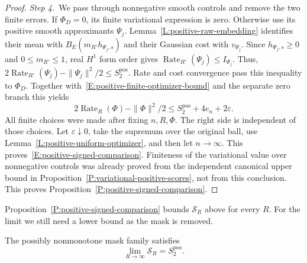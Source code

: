 \begin{proof}
  \medskip
  \noindent\textit{Step 4.~}We pass through nonnegative smooth controls and
  remove the two finite errors.
  If $\Phi_D = 0$, its finite variational expression is zero. Otherwise use its
  positive smooth approximants $\Psi_j$. Lemma~\ref{L:positive-raw-embedding}
  identifies their mean with $B_E(m_{R'}h_{\Psi_j,s})$ and their Gaussian cost
  with $v_{\Psi_j}$. Since $h_{\Psi_j,s} \ge 0$ and $0 \le m_{R'} \le 1$, real
  $H^1$ form order gives $\operatorname{Rate}_{R'}(\Psi_j) \le I_{\Psi_j}$.
  Thus, $2\operatorname{Rate}_{R'}(\Psi_j)-\|\Psi_j\|^2/2 \le
  S_2^{\mathrm{pos}}$. Rate and cost convergence pass this inequality to
  $\Phi_D$. Together with~\eqref{E:positive-finite-optimizer-bound} and the
  separate zero branch this yields
  \[
    2\operatorname{Rate}_R(\Phi)-\|\Phi\|^2/2
    \le S_2^{\mathrm{pos}}+4e_n+2\varepsilon .
  \]
  All finite choices were made after fixing $n,R,\Phi$. The right side is
  independent of those choices. Let $\varepsilon\downarrow0$, take the supremum
  over the original ball, use Lemma~\ref{L:positive-uniform-optimizer}, and then
  let $n \to \infty$. This proves~\eqref{E:positive-signed-comparison}.
  Finiteness of the variational value over nonnegative controls was already
  proved from the independent canonical upper bound in
  Proposition~\ref{P:variational-positive-scores}, not from this conclusion.
  This proves Proposition~\ref{P:positive-signed-comparison}.
\end{proof}

Proposition~\ref{P:positive-signed-comparison} bounds $\mathcal{S}_R$ above for
every $R$. For the limit we still need a lower bound as the mask is removed.

\begin{proposition}
  \label{P:positive-score-cutoff}
  The possibly nonmonotone mask family satisfies
  \[
    \lim_{R\to\infty}\mathcal{S}_R=S_2^{\mathrm{pos}}.
  \]
\end{proposition}

